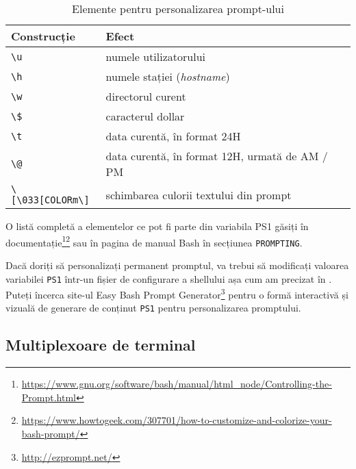 \begin{table}[!htb]
  \begin{center}
    \begin{tabular}{ p{} p{} }
      \toprule
        \textbf{Construcție} &
        \textbf{Efect} \\
      \midrule

        \verb|\u| &
        numele utilizatorului \\

        \verb|\h| &
        numele stației (\textit{hostname}) \\

        \verb|\w| &
        directorul curent \\

        \verb|\$| &
        caracterul dollar \\

        \verb|\t| &
        data curentă, în format 24H \\

        \verb|\@| &
        data curentă, în format 12H, urmată de AM / PM \\

        \verb|\[\033[COLORm\]| &
        schimbarea culorii textului din prompt \\
      \bottomrule
    \end{tabular}
  \end{center}
  \caption{Elemente pentru personalizarea prompt-ului}
  \label{tab:cli:prompt}
\end{table}

O listă completă a elementelor ce pot fi parte din variabila PS1 găsiți în
documentație\footnote{\url{https://www.gnu.org/software/bash/manual/html_node/Controlling-the-Prompt.html}}\footnote{\url{https://www.howtogeek.com/307701/how-to-customize-and-colorize-your-bash-prompt/}} sau în pagina de manual Bash în secțiunea \texttt{PROMPTING}.

Dacă doriți să personalizați permanent promptul, va trebui să modificați valoarea
variabilei \texttt{PS1} într-un fișier de configurare a shellului așa cum am precizat în . Puteți încerca site-ul Easy Bash Prompt
Generator\footnote{\url{http://ezprompt.net/}} pentru o formă interactivă și vizuală de
generare de conținut \texttt{PS1} pentru personalizarea promptului.

\subsection{Multiplexoare de terminal}
\label{sec:cli:shell-start:mux}


